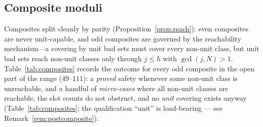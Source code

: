 \documentclass[11pt,a4paper]{article}
\numberwithin{equation}{section}
\theoremstyle{plain}
\theoremstyle{definition}
\theoremstyle{remark}
\begin{document}
\subsection{Composite moduli}\label{sec:composites}

Composites split cleanly by parity (Proposition~\ref{prop:reach}): even
composites are never unit-capable, and odd composites are governed by the
reachability mechanism---a covering by unit bad sets must cover every
non-unit class, but unit bad sets reach non-unit classes only through
$j\le h$ with $\gcd(j,N)>1$. Table~\ref{tab:composites} records the
outcome for every odd composite in the open part of the range
($49$--$111$): a \emph{proved} safety whenever some non-unit class is
unreachable, and a handful of \emph{micro-cases} where all non-unit
classes are reachable, the slot counts do not obstruct, and no \emph{unit}
covering exists anyway (Table~\ref{tab:composites}; the qualification
``unit'' is load-bearing --- see Remark~\ref{rem:postcomposite}).
\end{document}
